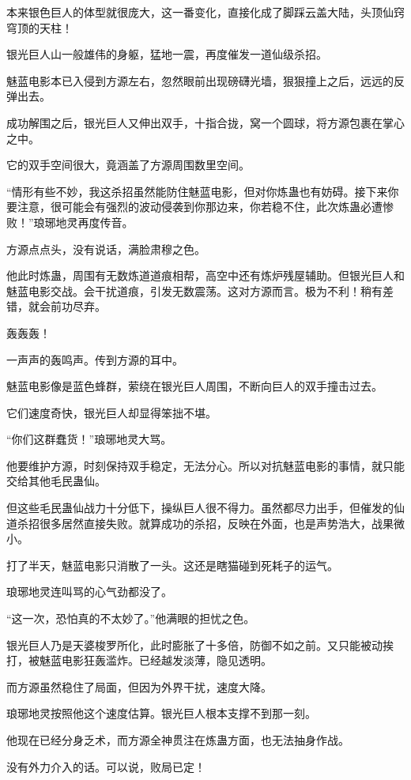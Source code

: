 \begin{this_body}
本来银色巨人的体型就很庞大，这一番变化，直接化成了脚踩云盖大陆，头顶仙窍穹顶的天柱！

银光巨人山一般雄伟的身躯，猛地一震，再度催发一道仙级杀招。

魅蓝电影本已入侵到方源左右，忽然眼前出现磅礴光墙，狠狠撞上之后，远远的反弹出去。

成功解围之后，银光巨人又伸出双手，十指合拢，窝一个圆球，将方源包裹在掌心之中。

它的双手空间很大，竟涵盖了方源周围数里空间。

“情形有些不妙，我这杀招虽然能防住魅蓝电影，但对你炼蛊也有妨碍。接下来你要注意，很可能会有强烈的波动侵袭到你那边来，你若稳不住，此次炼蛊必遭惨败！”琅琊地灵再度传音。

方源点点头，没有说话，满脸肃穆之色。

他此时炼蛊，周围有无数炼道道痕相帮，高空中还有炼炉残屋辅助。但银光巨人和魅蓝电影交战。会干扰道痕，引发无数震荡。这对方源而言。极为不利！稍有差错，就会前功尽弃。

轰轰轰！

一声声的轰鸣声。传到方源的耳中。

魅蓝电影像是蓝色蜂群，萦绕在银光巨人周围，不断向巨人的双手撞击过去。

它们速度奇快，银光巨人却显得笨拙不堪。

“你们这群蠢货！”琅琊地灵大骂。

他要维护方源，时刻保持双手稳定，无法分心。所以对抗魅蓝电影的事情，就只能交给其他毛民蛊仙。

但这些毛民蛊仙战力十分低下，操纵巨人很不得力。虽然都尽力出手，但催发的仙道杀招很多居然直接失败。就算成功的杀招，反映在外面，也是声势浩大，战果微小。

打了半天，魅蓝电影只消散了一头。这还是瞎猫碰到死耗子的运气。

琅琊地灵连叫骂的心气劲都没了。

“这一次，恐怕真的不太妙了。”他满眼的担忧之色。

银光巨人乃是天婆梭罗所化，此时膨胀了十多倍，防御不如之前。又只能被动挨打，被魅蓝电影狂轰滥炸。已经越发淡薄，隐见透明。

而方源虽然稳住了局面，但因为外界干扰，速度大降。

琅琊地灵按照他这个速度估算。银光巨人根本支撑不到那一刻。

他现在已经分身乏术，而方源全神贯注在炼蛊方面，也无法抽身作战。

没有外力介入的话。可以说，败局已定！


\end{this_body}

